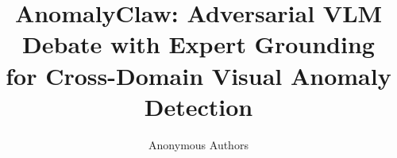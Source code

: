 \documentclass{article}
\title{AnomalyClaw: Adversarial VLM Debate with Expert Grounding\\for Cross-Domain Visual Anomaly Detection}
\author{Anonymous Authors}
\theoremstyle{plain}
\theoremstyle{definition}
\theoremstyle{remark}
\begin{document}
\maketitle

\begin{abstract}

\end{abstract}










\newpage
\appendix

\end{document}
